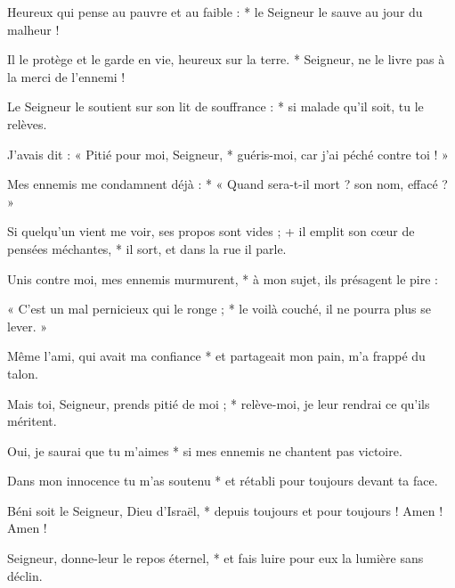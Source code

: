 \item Heureux qui pense au pauvre et au faible : * le Seigneur le sauve au jour du malheur !

\item Il le protège et le garde en vie, heureux sur la terre. * Seigneur, ne le livre pas à la merci de l'ennemi !

\item Le Seigneur le soutient sur son lit de souffrance : * si malade qu'il soit, tu le relèves.

\item J'avais dit : « Pitié pour moi, Seigneur, * guéris-moi, car j'ai péché contre toi ! »

\item Mes ennemis me condamnent déjà : * « Quand sera-t-il mort ? son nom, effacé ? »

\item Si quelqu'un vient me voir, ses propos sont vides ; + il emplit son cœur de pensées méchantes, * il sort, et dans la rue il parle.

\item Unis contre moi, mes ennemis murmurent, * à mon sujet, ils présagent le pire :

\item « C'est un mal pernicieux qui le ronge ; * le voilà couché, il ne pourra plus se lever. »

\item Même l'ami, qui avait ma confiance * et partageait mon pain, m'a frappé du talon.

\item Mais toi, Seigneur, prends pitié de moi ; * relève-moi, je leur rendrai ce qu'ils méritent.

\item Oui, je saurai que tu m'aimes * si mes ennemis ne chantent pas victoire.

\item Dans mon innocence tu m'as soutenu * et rétabli pour toujours devant ta face.

\item Béni soit le Seigneur, Dieu d'Israël, * depuis toujours et pour toujours ! Amen ! Amen !

\item Seigneur, donne-leur le repos éternel, * et fais luire pour eux la lumière sans déclin.